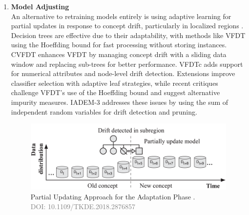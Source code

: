 \begin{enumerate}[label=\Alph*.]
\item \textbf{Model Adjusting} \\
An alternative to retraining models entirely is using adaptive learning for partial updates in response to concept drift, particularly in localized regions \cite{pratama2015evolving}. Decision trees are effective due to their adaptability, with methods like VFDT \cite{domingos2000mining} using the Hoeffding bound for fast processing without storing instances. CVFDT \cite{hulten2001mining} enhances VFDT by managing concept drift with a sliding data window and replacing sub-trees for better performance. VFDTc \cite{hulten2001mining} adds support for numerical attributes and node-level drift detection. Extensions \cite{yang2012incrementally, yang2015countering} improve classifier selection with adaptive leaf strategies, while recent critiques \cite{rutkowski2012decision, rutkowski2014new} challenge VFDT's use of the Hoeffding bound and suggest alternative impurity measures. IADEM-3 \cite{frias2016online} addresses these issues by using the sum of independent random variables for drift detection and pruning.

 \begin{figure}[!ht]
    \centering
    \includegraphics[width=.9\textwidth]{2_Background/figures/partial_update.png}
    \caption{Partial Updating Approach for the Adaptation Phase \cite{8496795}. \\ \textcolor{gray}{\fontsize{10}{0}\selectfont DOI: 10.1109/TKDE.2018.2876857}}
    \label{fig:concept-drift-partial-update}
\end{figure}
\end{enumerate}
